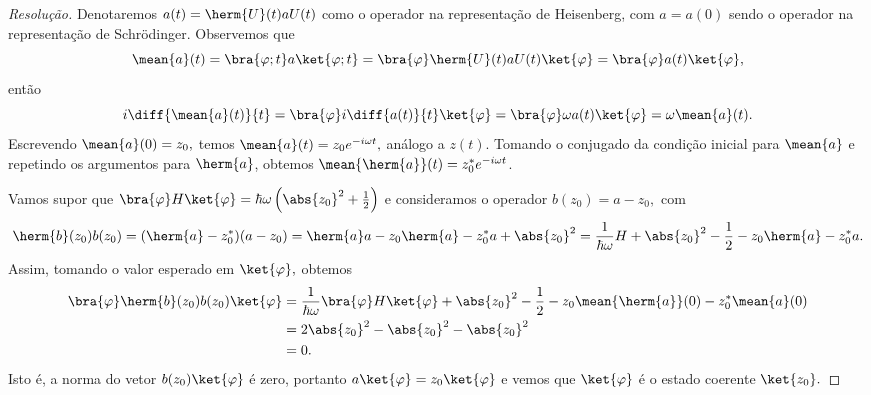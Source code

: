\begin{proof}[Resolução]
   Denotaremos \(a(t) = \herm{U}(t) a U(t)\) como o operador na representação de Heisenberg, com \(a = a(0)\) sendo o operador na representação de Schrödinger. Observemos que
   \begin{equation*}
      \mean{a}(t) = \bra{\varphi; t}a\ket{\varphi; t} = \bra{\varphi} \herm{U}(t) a U(t) \ket{\varphi} = \bra{\varphi} a(t) \ket{\varphi},
   \end{equation*}
   então
   \begin{equation*}
      i \diff{\mean{a}(t)}{t} = \bra{\varphi} i\diff{a(t)}{t} \ket{\varphi} = \bra{\varphi} \omega a(t) \ket{\varphi} = \omega \mean{a}(t).
   \end{equation*}
   Escrevendo \(\mean{a}(0) = z_0,\) temos \(\mean{a}(t) = z_0 e^{-i \omega t},\) análogo a \(z(t).\) 
   Tomando o conjugado da condição inicial para \(\mean{a}\) e repetindo os argumentos para \(\herm{a}\), obtemos \(\mean{\herm{a}}(t) = z_0^* e^{-i \omega t}\).

   Vamos supor que \(\bra{\varphi}H\ket{\varphi} = \hbar \omega \left(\abs{z_0}^2 + \frac12\right)\) e consideramos o operador \(b(z_0) = a - z_0,\) com
   \begin{equation*}
      \herm{b}(z_0) b(z_0) = (\herm{a} - z_0^*)(a - z_0) = \herm{a}a - z_0 \herm{a} - z_0^* a + \abs{z_0}^2 = \frac1{\hbar \omega} H + \abs{z_0}^2 - \frac12 - z_0 \herm{a} - z_0^* a.
   \end{equation*}
   Assim, tomando o valor esperado em \(\ket{\varphi},\) obtemos
   \begin{align*}
      \bra{\varphi} \herm{b}(z_0)b(z_0) \ket{\varphi} &= \frac{1}{\hbar \omega} \bra{\varphi}H\ket{\varphi} + \abs{z_0}^2 - \frac12 - z_0 \mean{\herm{a}}(0) - z_0^* \mean{a}(0)\\
                                                      &= 2\abs{z_0}^2 - \abs{z_0}^2 - \abs{z_0}^2\\
                                                      &= 0.
   \end{align*}
   Isto é, a norma do vetor \(b(z_0) \ket{\varphi}\) é zero, portanto \(a \ket{\varphi} = z_0 \ket{\varphi}\) e vemos que \(\ket{\varphi}\) é o estado coerente \(\ket{z_0}.\)
\end{proof}
